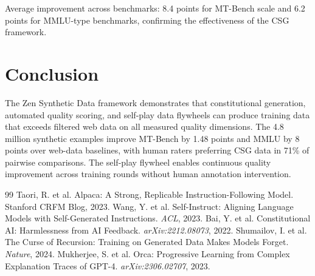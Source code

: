 \documentclass[11pt,a4paper]{article}
\begin{document}
Average improvement across benchmarks: 8.4 points for MT-Bench scale and 6.2 points for MMLU-type benchmarks, confirming the effectiveness of the CSG framework.

\section{Conclusion}

The Zen Synthetic Data framework demonstrates that constitutional generation, automated quality scoring, and self-play data flywheels can produce training data that exceeds filtered web data on all measured quality dimensions. The 4.8 million synthetic examples improve MT-Bench by 1.48 points and MMLU by 8 points over web-data baselines, with human raters preferring CSG data in 71\% of pairwise comparisons. The self-play flywheel enables continuous quality improvement across training rounds without human annotation intervention.

\begin{thebibliography}{99}
 Taori, R. et al. Alpaca: A Strong, Replicable Instruction-Following Model. Stanford CRFM Blog, 2023.
 Wang, Y. et al. Self-Instruct: Aligning Language Models with Self-Generated Instructions. \textit{ACL}, 2023.
 Bai, Y. et al. Constitutional AI: Harmlessness from AI Feedback. \textit{arXiv:2212.08073}, 2022.
 Shumailov, I. et al. The Curse of Recursion: Training on Generated Data Makes Models Forget. \textit{Nature}, 2024.
 Mukherjee, S. et al. Orca: Progressive Learning from Complex Explanation Traces of GPT-4. \textit{arXiv:2306.02707}, 2023.
\end{thebibliography}
\end{document}
